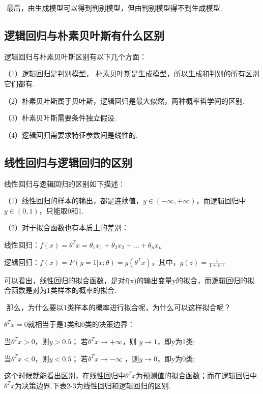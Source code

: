 ​ 最后，由生成模型可以得到判别模型，但由判别模型得不到生成模型.

\subsection{逻辑回归与朴素贝叶斯有什么区别}\label{ux903bux8f91ux56deux5f52ux4e0eux6734ux7d20ux8d1dux53f6ux65afux6709ux4ec0ux4e48ux533aux522b}

逻辑回归与朴素贝叶斯区别有以下几个方面：

（1）逻辑回归是判别模型，
朴素贝叶斯是生成模型，所以生成和判别的所有区别它们都有.

（2）朴素贝叶斯属于贝叶斯，逻辑回归是最大似然，两种概率哲学间的区别.

（3）朴素贝叶斯需要条件独立假设.

（4）逻辑回归需要求特征参数间是线性的.

\subsection{线性回归与逻辑回归的区别}\label{ux7ebfux6027ux56deux5f52ux4e0eux903bux8f91ux56deux5f52ux7684ux533aux522b}

线性回归与逻辑回归的区别如下描述：

（1）线性回归的样本的输出，都是连续值，$y \in (-\infty ,+\infty )$，而逻辑回归中
$y \in (0,1)$，只能取0和1.

（2）对于拟合函数也有本质上的差别：

​
线性回归：$f(x)=\theta ^{T}x=\theta _{1}x _{1}+\theta _{2}x _{2}+...+\theta _{n}x _{n}$

​
逻辑回归：$f(x)=P(y=1|x;\theta )=g(\theta ^{T}x)$，其中，$g(z)=\frac{1}{1+e^{-z}}$

​
可以看出，线性回归的拟合函数，是对f(x)的输出变量y的拟合，而逻辑回归的拟合函数是对为1类样本的概率的拟合.

​ 那么，为什么要以1类样本的概率进行拟合呢，为什么可以这样拟合呢？

​ $\theta ^{T}x=0$就相当于是1类和0类的决策边界：

​
当$\theta ^{T}x>0$，则$y>0.5$；
若$\theta ^{T}x\rightarrow +\infty $，则
$y\rightarrow  1 $，即y为1类;

​
当$\theta ^{T}x<0$，则$y<0.5$；
若$\theta ^{T}x\rightarrow -\infty$ ，则$y\rightarrow  0 $，即y为0类;

这个时候就能看出区别，在线性回归中$\theta ^{T}x$为预测值的拟合函数；而在逻辑回归中$\theta ^{T}x$为决策边界.下表2-3为线性回归和逻辑回归的区别.

